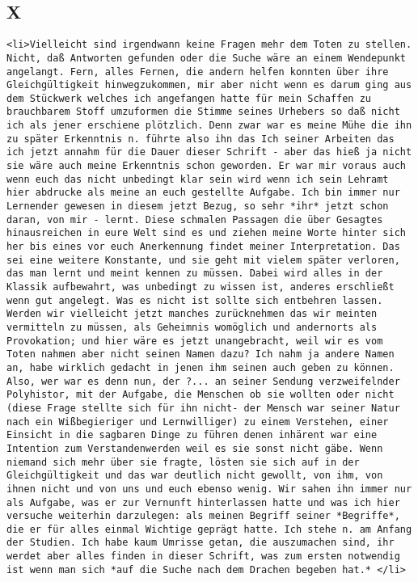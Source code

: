 \documentclass[
]{article}
\author{}
\date{\vspace{-2.5em}}
\begin{document}
\subsection{X}\label{x}

\begin{verbatim}
<li>Vielleicht sind irgendwann keine Fragen mehr dem Toten zu stellen. Nicht, daß Antworten gefunden oder die Suche wäre an einem Wendepunkt angelangt. Fern, alles Fernen, die andern helfen konnten über ihre Gleichgültigkeit hinwegzukommen, mir aber nicht wenn es darum ging aus dem Stückwerk welches ich angefangen hatte für mein Schaffen zu brauchbarem Stoff umzuformen die Stimme seines Urhebers so daß nicht ich als jener erschiene plötzlich. Denn zwar war es meine Mühe die ihn zu später Erkenntnis n. führte also ihn das Ich seiner Arbeiten das ich jetzt annahm für die Dauer dieser Schrift - aber das hieß ja nicht sie wäre auch meine Erkenntnis schon geworden. Er war mir voraus auch wenn euch das nicht unbedingt klar sein wird wenn ich sein Lehramt hier abdrucke als meine an euch gestellte Aufgabe. Ich bin immer nur Lernender gewesen in diesem jetzt Bezug, so sehr *ihr* jetzt schon daran, von mir - lernt. Diese schmalen Passagen die über Gesagtes hinausreichen in eure Welt sind es und ziehen meine Worte hinter sich her bis eines vor euch Anerkennung findet meiner Interpretation. Das sei eine weitere Konstante, und sie geht mit vielem später verloren, das man lernt und meint kennen zu müssen. Dabei wird alles in der Klassik aufbewahrt, was unbedingt zu wissen ist, anderes erschließt wenn gut angelegt. Was es nicht ist sollte sich entbehren lassen. Werden wir vielleicht jetzt manches zurücknehmen das wir meinten vermitteln zu müssen, als Geheimnis womöglich und andernorts als Provokation; und hier wäre es jetzt unangebracht, weil wir es vom Toten nahmen aber nicht seinen Namen dazu? Ich nahm ja andere Namen an, habe wirklich gedacht in jenen ihm seinen auch geben zu können. Also, wer war es denn nun, der ?... an seiner Sendung verzweifelnder Polyhistor, mit der Aufgabe, die Menschen ob sie wollten oder nicht (diese Frage stellte sich für ihn nicht- der Mensch war seiner Natur nach ein Wißbegieriger und Lernwilliger) zu einem Verstehen, einer Einsicht in die sagbaren Dinge zu führen denen inhärent war eine Intention zum Verstandenwerden weil es sie sonst nicht gäbe. Wenn niemand sich mehr über sie fragte, lösten sie sich auf in der Gleichgültigkeit und das war deutlich nicht gewollt, von ihm, von ihnen nicht und von uns und euch ebenso wenig. Wir sahen ihn immer nur als Aufgabe, was er zur Vernunft hinterlassen hatte und was ich hier versuche weiterhin darzulegen: als meinen Begriff seiner *Begriffe*, die er für alles einmal Wichtige geprägt hatte. Ich stehe n. am Anfang der Studien. Ich habe kaum Umrisse getan, die auszumachen sind, ihr werdet aber alles finden in dieser Schrift, was zum ersten notwendig ist wenn man sich *auf die Suche nach dem Drachen begeben hat.* </li>

\end{verbatim}
\end{document}
